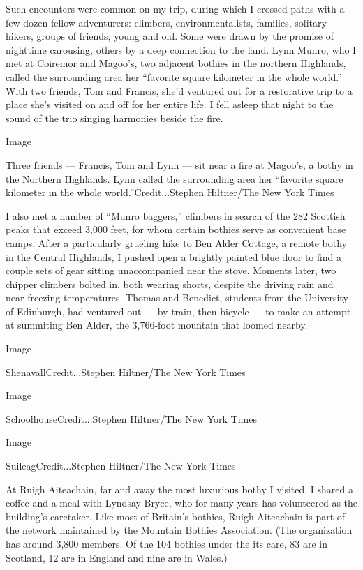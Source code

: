 Such encounters were common on my trip, during which I crossed paths
with a few dozen fellow adventurers: climbers, environmentalists,
families, solitary hikers, groups of friends, young and old. Some were
drawn by the promise of nighttime carousing, others by a deep connection
to the land. Lynn Munro, who I met at Coiremor and Magoo's, two adjacent
bothies in the northern Highlands, called the surrounding area her
``favorite square kilometer in the whole world.'' With two friends, Tom
and Francis, she'd ventured out for a restorative trip to a place she's
visited on and off for her entire life. I fell asleep that night to the
sound of the trio singing harmonies beside the fire.

Image

Three friends --- Francis, Tom and Lynn --- sit near a fire at Magoo's,
a bothy in the Northern Highlands. Lynn called the surrounding area her
``favorite square kilometer in the whole world.''Credit...Stephen
Hiltner/The New York Times

I also met a number of ``Munro baggers,'' climbers in search of the 282
Scottish peaks that exceed 3,000 feet, for whom certain bothies serve as
convenient base camps. After a particularly grueling hike to Ben Alder
Cottage, a remote bothy in the Central Highlands, I pushed open a
brightly painted blue door to find a couple sets of gear sitting
unaccompanied near the stove. Moments later, two chipper climbers bolted
in, both wearing shorts, despite the driving rain and near-freezing
temperatures. Thomas and Benedict, students from the University of
Edinburgh, had ventured out --- by train, then bicycle --- to make an
attempt at summiting Ben Alder, the 3,766-foot mountain that loomed
nearby.

Image

ShenavallCredit...Stephen Hiltner/The New York Times

Image

SchoolhouseCredit...Stephen Hiltner/The New York Times

Image

SuileagCredit...Stephen Hiltner/The New York Times

At Ruigh Aiteachain, far and away the most luxurious bothy I visited, I
shared a coffee and a meal with Lyndsay Bryce, who for many years has
volunteered as the building's caretaker. Like most of Britain's bothies,
Ruigh Aiteachain is part of the network maintained by the Mountain
Bothies Association. (The organization has around 3,800 members. Of the
104 bothies under the its care, 83 are in Scotland, 12 are in England
and nine are in Wales.)

